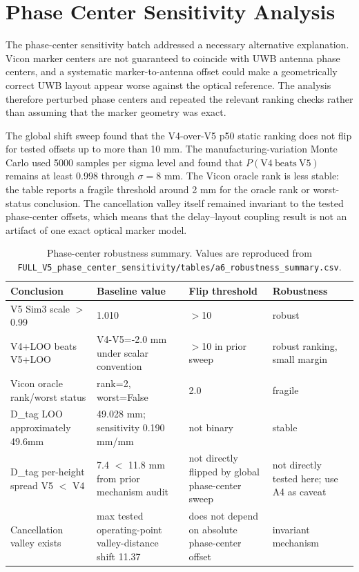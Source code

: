 \documentclass[11pt,a4paper]{article}
\begin{document}
\section{Phase Center Sensitivity Analysis}

The phase-center sensitivity batch addressed a necessary alternative explanation. Vicon marker centers are not guaranteed to coincide with UWB antenna phase centers, and a systematic marker-to-antenna offset could make a geometrically correct UWB layout appear worse against the optical reference. The analysis therefore perturbed phase centers and repeated the relevant ranking checks rather than assuming that the marker geometry was exact.

The global shift sweep found that the V4-over-V5 p50 static ranking does not flip for tested offsets up to more than 10 mm. The manufacturing-variation Monte Carlo used 5000 samples per sigma level and found that $P(\mathrm{V4\ beats\ V5})$ remains at least 0.998 through $\sigma=8$ mm. The Vicon oracle rank is less stable: the table reports a fragile threshold around 2 mm for the oracle rank or worst-status conclusion. The cancellation valley itself remained invariant to the tested phase-center offsets, which means that the delay--layout coupling result is not an artifact of one exact optical marker model.

\begin{table}[H]
\centering
\caption{Phase-center robustness summary. Values are reproduced from \texttt{FULL\_V5\_phase\_center\_sensitivity/tables/a6\_robustness\_summary.csv}.}
\label{tab:phase_center}
\small
\begin{tabular}{@{}p{48mm}p{42mm}p{34mm}p{26mm}@{}}
\toprule
Conclusion & Baseline value & Flip threshold & Robustness \\
\midrule
V5 Sim3 scale $>$ 0.99 & 1.010 & $>$10 & robust \\
V4+LOO beats V5+LOO & V4-V5=-2.0 mm under scalar convention & $>$10 in prior sweep & robust ranking, small margin \\
Vicon oracle rank/worst status & rank=2, worst=False & 2.0 & fragile \\
D\_tag LOO approximately 49.6mm & 49.028 mm; sensitivity 0.190 mm/mm & not binary & stable \\
D\_tag per-height spread V5 $<$ V4 & 7.4 $<$ 11.8 mm from prior mechanism audit & not directly flipped by global phase-center sweep & not directly tested here; use A4 as caveat \\
Cancellation valley exists & max tested operating-point valley-distance shift 11.37 & does not depend on absolute phase-center offset & invariant mechanism \\
\bottomrule
\end{tabular}
\end{table}
\end{document}
